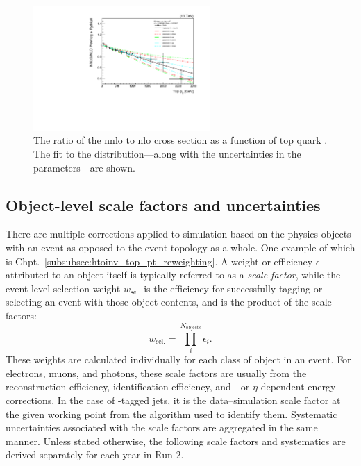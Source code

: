 \begin{figure}[htbp]
    \centering
    \includegraphics[width=0.6\textwidth]{figures/top_pt_reweighting/top_pt_reweighting_central.pdf}
    \caption[The ratio of the NNLO to NLO \ttbar cross section as a function of top quark \pt. The fit to the distribution---along with the uncertainties in the parameters---are shown]{The ratio of the \acrshort{nnlo} to \acrshort{nlo} \ttbar cross section as a function of top quark \pt. The fit to the distribution---along with the uncertainties in the parameters---are shown.}
    \label{fig:top_pt_reweighting}
\end{figure}





\subsection{Object-level scale factors and uncertainties}
\label{subsec:htoinv_SFs_systs_objects}

There are multiple corrections applied to simulation based on the physics objects with an event as opposed to the event topology as a whole. One example of which is Chpt.~\ref{subsubsec:htoinv_top_pt_reweighting}. A weight or efficiency $\epsilon$ attributed to an object itself is typically referred to as a \emph{scale factor}, while the event-level selection weight $w_{\mathrm{sel.}}$ is the efficiency for successfully tagging or selecting an event with those object contents, and is the product of the scale factors:
\begin{equation}
    w_{\mathrm{sel.}} = \prod_i^{N_\mathrm{objects}} \epsilon_i.
    \label{eq:event_selection_weight}
\end{equation}
These weights are calculated individually for each class of object in an event. For electrons, muons, and photons, these scale factors are usually from the reconstruction efficiency, identification efficiency, and \pt- or $\eta$-dependent energy corrections. In the case of \Pbottom-tagged \glspl{jet}, it is the data--simulation scale factor at the given working point from the algorithm used to identify them. Systematic uncertainties associated with the scale factors are aggregated in the same manner. Unless stated otherwise, the following scale factors and systematics are derived separately for each year in Run-2.


